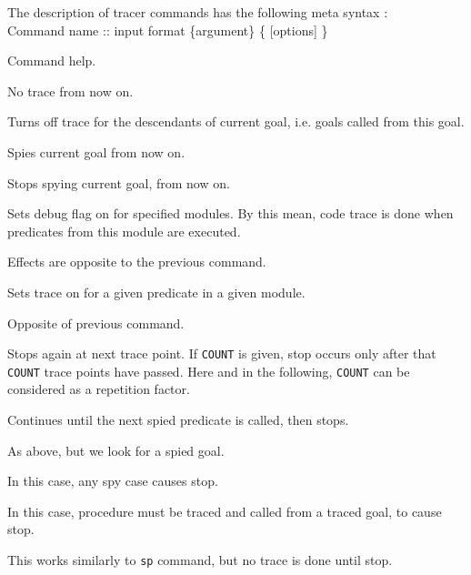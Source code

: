 The description of tracer commands has the following meta syntax :
\vspace{2ex}\\
\hspace*{5em}Command name :: input format  \{argument\}  \{ [options] \}
\vspace{2ex}
\begin{itemize}

Command help.

No trace from now on.

Turns off trace for the descendants of current goal,
i.e. goals called from this goal.

Spies current goal from now on.

Stops spying current goal, from now on.

Sets debug flag on for specified modules. By this mean, code trace is done
when predicates from this module are executed.

Effects are opposite to the previous command.

Sets trace on for a given predicate in a given module.

Opposite of previous command.

Stops again at next trace point. If \verb|COUNT| is given, stop occurs only
after that \verb|COUNT| trace points have passed. Here and in the following,
\verb|COUNT| can be considered as a repetition factor.

Continues until the next spied predicate is called, then stops.

As above, but we look for a spied goal.

In this case, any spy case causes stop.

In this case, procedure must be traced and called from a traced goal, to
cause stop.

This works similarly to \verb|sp| command, but no trace is done until stop.


\end{itemize}
